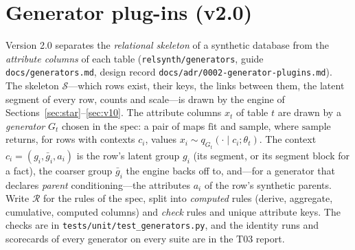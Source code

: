 \section{Generator plug-ins (v2.0)}\label{sec:v20gen}
\setcounter{savedpropgen}{\value{proposition}}
\setcounter{proposition}{699}
Version 2.0 separates the \emph{relational skeleton} of a synthetic database from the \emph{attribute columns} of
each table (\texttt{relsynth/generators}, guide \texttt{docs/generators.md}, design record
\texttt{docs/adr/0002-generator-plugins.md}). The skeleton $\mathcal S$---which rows exist, their keys, the links
between them, the latent segment of every row, counts and scale---is drawn by the engine of
Sections~\ref{sec:star}--\ref{sec:v10}. The attribute columns $x_t$ of table $t$ are drawn by a \emph{generator}
$G_t$ chosen in the spec: a pair of maps $\mathrm{fit}$ and $\mathrm{sample}$, where $\mathrm{sample}$ returns, for
rows with contexts $c_i$, values $x_i\sim q_{G_t}(\cdot\mid c_i;\theta_t)$. The context $c_i=(g_i,\bar g_i,a_i)$ is
the row's latent group $g_i$ (its segment, or its segment block for a fact), the coarser group $\bar g_i$ the engine
backs off to, and---for a generator that declares \emph{parent} conditioning---the attributes $a_i$ of the row's
synthetic parents. Write $\mathcal R$ for the rules of the spec, split into \emph{computed} rules (derive,
aggregate, cumulative, computed columns) and \emph{check} rules and unique attribute keys. The checks are in
\texttt{tests/unit/test\_generators.py}, and the identity runs and scorecards of every generator on every suite are
in the T03 report.

